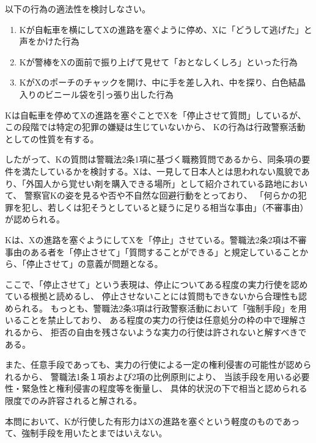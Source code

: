 \documentclass[11pt]{jsarticle}
\title{\vspace{-30mm}{\textgt{\Large{\fbox{1} 職務質問 }}}}
\date{\vspace{-15mm}}
\begin{document}
\maketitle
\begin{itembox}[l]{以下の行為の適法性を検討しなさい。}
	\begin {enumerate}
		\item Kが自転車を横にしてXの進路を塞ぐように停め、Xに「どうして逃げた」と声をかけた行為
		\item Kが警棒をXの面前で振り上げて見せて「おとなしくしろ」といった行為
		\item KがXのポーチのチャックを開け、中に手を差し入れ、中を探り、白色結晶入りのビニール袋を引っ張り出した行為
	\end{enumerate}
\end{itembox}

	\sectionB{}
		Kは自転車を停めてXの進路を塞ぐことでXを「停止させて質問」しているが、この段階では特定の犯罪の嫌疑は生じていないから、
		Kの行為は行政警察活動としての性質を有する。
		
		
		\sectionC{}
			したがって、Kの質問は警職法2条1項に基づく職務質問であるから、同条項の要件を満たしているかを検討する。Xは、一見して日本人とは思われない風貌であり、「外国人から覚せい剤を購入できる場所」として紹介されている路地において、
			警察官Kの姿を見るや否や不自然な回避行動をとっており、
			「何らかの犯罪を犯し、若しくは犯そうとしていると疑うに足りる相当な事由」（不審事由）が認められる。
			
		\sectionC{}
			Kは、Xの進路を塞ぐようにしてXを「停止」させている。警職法2条2項は不審事由のある者を「停止させて」「質問することができる」と規定していることから、「停止させて」の意義が問題となる。
			
			ここで、「停止させて」という表現は、停止についてある程度の実力行使を認めている根拠と読めるし、
			停止させないことには質問もできないから合理性も認められる。
			もっとも、警職法2条3項は行政警察活動において「強制手段」を用いることを禁止しており、
			ある程度の実力の行使は任意処分の枠の中で理解されるから、
			拒否の自由を残さないような実力の行使は許されないと解すべきである。
			
			また、任意手段であっても、実力の行使による一定の権利侵害の可能性が認められるから、
			警職法1条１項および2項の比例原則により、
			当該手段を用いる必要性・緊急性と権利侵害の程度等を衡量し、
			具体的状況の下で相当と認められる限度でのみ許容されると解される。
			
		\sectionC{}
			本問において、Kが行使した有形力はXの進路を塞ぐという軽度のものであって、強制手段を用いたとまではいえない。
		
\end{document}
